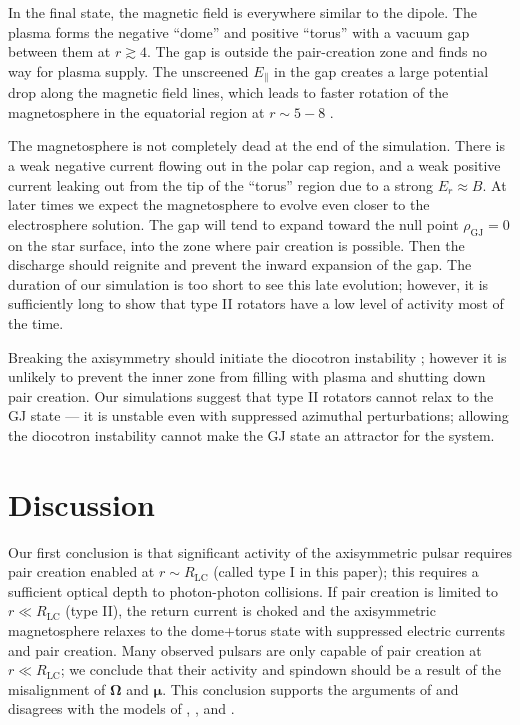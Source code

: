 In the final state, the magnetic field is everywhere similar to the dipole.
The plasma forms the negative ``dome'' and positive ``torus''
with a vacuum gap between them at $r\gtrsim 4$.
The gap is outside the pair-creation zone and finds no way for plasma supply.
The unscreened $E_\parallel$ in the gap creates a
large potential drop along the
magnetic field lines, which leads to faster rotation of the magnetosphere in the
equatorial region at $r\sim 5-8$
\citep[cf.][]{wada_particle_2011}.

The magnetosphere is not completely dead at the end of the simulation.
There is a weak negative current flowing out in the polar cap region, and
a weak positive current leaking out from the tip of the ``torus'' region
due to a strong $E_r\approx B$.
At later times we expect the magnetosphere to evolve even closer to
the electrosphere solution.  The gap will tend to expand toward the
null point $\rho_\mathrm{GJ}=0$
on the star surface, into the zone where pair creation is
possible. Then the discharge should reignite and prevent the inward
expansion of the gap. The duration of our simulation is too short to
see this late evolution; however, it is sufficiently long to show that type
II rotators have a low level of activity most of the time.

Breaking the axisymmetry should initiate the diocotron instability
\citep{philippov_ab_2014};  however it is unlikely to
prevent the inner zone from filling with plasma and
shutting down pair creation. Our simulations suggest that type II rotators
cannot relax to the GJ state
--- it is unstable even with suppressed azimuthal perturbations; allowing the
diocotron instability cannot make the GJ state an attractor for the system.



\section{Discussion}


Our first conclusion is that significant activity of the axisymmetric pulsar
requires pair creation enabled at $r\sim R_\mathrm{LC}$
(called type I in this paper); this requires a sufficient optical
depth to photon-photon collisions.
If pair creation is limited to $r\ll R_\mathrm{LC}$ (type II),
the return current is choked and the axisymmetric magnetosphere relaxes to the
dome+torus state with suppressed electric currents and pair creation.
Many observed pulsars are only capable of pair creation at
$r\ll R_\mathrm{LC}$; we conclude that their activity and spindown should
be a result of the misalignment of $\boldsymbol{\Omega}$ and $\boldsymbol{\mu}$. This conclusion
supports the arguments of
\citet{michel_state_2004}
 and disagrees with the models of
\citet{goldreich_pulsar_1969},
\citet{ruderman_theory_1975},
and
\citet{gruzinov_aristotelian_2013}.

